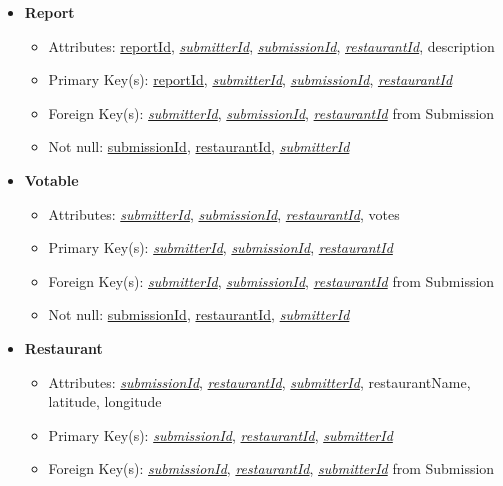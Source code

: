 \documentclass{article}
\begin{document}
\begin{itemize}
        \item \textbf{Report}
        \begin{itemize}
            \item Attributes: \underline{reportId}, \underline{\textit{submitterId}}, \underline{\textit{submissionId}}, \underline{\textit{restaurantId}}, description
            \item Primary Key(s): \underline{reportId}, \underline{\textit{submitterId}}, \underline{\textit{submissionId}}, \underline{\textit{restaurantId}}
            \item Foreign Key(s): \underline{\textit{submitterId}}, \underline{\textit{submissionId}}, \underline{\textit{restaurantId}} from Submission
            \item Not null: \underline{submissionId}, \underline{restaurantId}, \underline{\textit{submitterId}}
        \end{itemize}
            
        \item \textbf{Votable}
        \begin{itemize}
            \item Attributes: \underline{\textit{submitterId}}, \underline{\textit{submissionId}}, \underline{\textit{restaurantId}}, votes
            \item Primary Key(s): \underline{\textit{submitterId}}, \underline{\textit{submissionId}}, \underline{\textit{restaurantId}}
            \item Foreign Key(s): \underline{\textit{submitterId}}, \underline{\textit{submissionId}}, \underline{\textit{restaurantId}} from Submission
            \item Not null: \underline{submissionId}, \underline{restaurantId}, \underline{\textit{submitterId}}
        \end{itemize}

        \item \textbf{Restaurant}
        \begin{itemize}
            \item Attributes: \underline{\textit{submissionId}}, \underline{\textit{restaurantId}}, \underline{\textit{submitterId}}, restaurantName, latitude, longitude
            \item Primary Key(s): \underline{\textit{submissionId}}, \underline{\textit{restaurantId}}, \underline{\textit{submitterId}}
            \item Foreign Key(s): \underline{\textit{submissionId}}, \underline{\textit{restaurantId}}, \underline{\textit{submitterId}} from Submission
        \end{itemize}


\end{itemize}
\end{document}
